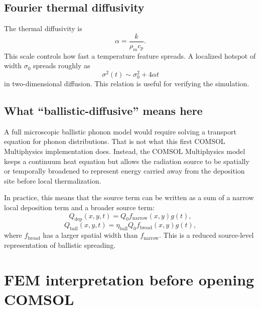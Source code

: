\documentclass[11pt]{article}
\newcommand{\COMSOL}{COMSOL Multiphysics}
\newcommand{\comsol}{\COMSOL}
\begin{document}
\subsection{Fourier thermal diffusivity}
The thermal diffusivity is
\begin{equation}
\alpha=\frac{k}{\rho_m c_p}.
\label{eq:alpha}
\end{equation}
This scale controls how fast a temperature feature spreads.  A localized hotspot of width \(\sigma_0\) spreads roughly as
\begin{equation}
\sigma^2(t)\sim \sigma_0^2+4\alpha t
\end{equation}
in two-dimensional diffusion.  This relation is useful for verifying the simulation.

\subsection{What ``ballistic-diffusive'' means here}
A full microscopic ballistic phonon model would require solving a transport equation for phonon distributions.  That is not what this first \comsol{} implementation does.  Instead, the \comsol{} model keeps a continuum heat equation but allows the radiation source to be spatially or temporally broadened to represent energy carried away from the deposition site before local thermalization.

In practice, this means that the source term can be written as a sum of a narrow local deposition term and a broader source term:
\begin{equation}
Q_{\mathrm{dep}}(x,y,t)=Q_0 f_{\mathrm{narrow}}(x,y)g(t),
\end{equation}
\begin{equation}
Q_{\mathrm{ball}}(x,y,t)=\eta_{\mathrm{ball}}Q_0 f_{\mathrm{broad}}(x,y)g(t),
\end{equation}
where \(f_{\mathrm{broad}}\) has a larger spatial width than \(f_{\mathrm{narrow}}\).  This is a reduced source-level representation of ballistic spreading.

\section{FEM interpretation before opening COMSOL}
\end{document}
